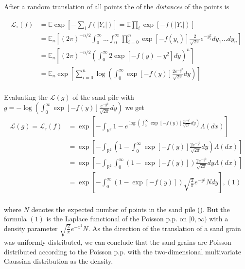 \documentclass{article}
\begin{document}
\begin{itemize}
  After a random translation of all points the  of the \textit{distances} of the points is 

  \begin{align*}
    \mathcal{L}_{\tau}(f) &= \mathbb{E} \exp \left[-\sum_i f(|Y_i|) \right] = \mathbb{E}  \prod_i \exp \left[  -f(|Y_i|)   \right]  \\
    &= \mathbb{E}_n \left[  (2 \pi)^{-n/2}  \int_0^{\infty} \dots \int_0^{\infty}  \prod_{i = 0}^n \exp \left[  -f(y_i)  \right] \frac{2}{\sqrt{2 \pi}}e^{-y_i^2} dy_1 \dots d y_n \right] \\
    &= \mathbb{E}_n \left[(2 \pi)^{-n/2}  \left( \int_{0}^{\infty}  2\exp \left[  -f(y) - y^2   \right] dy \right)^n\right] \\
    &= \mathbb{E}_n \exp \left[ \sum_{i= 0}^n \log \left(   \int_{0}^{\infty}  \exp \left[  -f(y)  \right] \frac{2e^{-y^2}}{\sqrt{2 \pi}} dy \right) \right] \\ 
  \end{align*}

  Evaluating the   $\mathcal{L}(g)$ of the sand pile with $ g = - \log \left(   \int_{0}^{\infty}  \exp \left[  -f(y)  \right] \frac{e^{-y^2}}{\sqrt{2 \pi}} dy \right)  $ we get
    \begin{align*}
      \mathcal{L}(g) = \mathcal{L}_{\tau}(f)& = \exp \left[  -\int_{\mathbb{R}^2} 1 -  e^{\log \left(   \int_{0}^{\infty}  \exp \left[  -f(y)   \right] \frac{2e^{-y^2}}{\sqrt{2 \pi}} dy \right) }\Lambda(dx) \right]    \\
      &= \exp \left[-\int_{\mathbb{R}^2} \left(1  -   \int_{0}^{\infty}  \exp [-f(y)] \frac{2e^{-y^2}}{\sqrt{2 \pi}}  dy \right)  \Lambda(dx)  \right] \\
        &= \exp \left[-\int_{\mathbb{R}^2}\int_{0}^{\infty} \left(1  -     \exp [-f(y)]   \right) \frac{2e^{-y^2}}{\sqrt{2 \pi}}dy  \Lambda(dx)  \right] \\ 
        &= \exp \left[-\int_{0}^{\infty} \left(1  -     \exp [-f(y)]   \right)  \sqrt{\frac{2}{\pi}}e^{-y^2} N dy    \right], (1) \\   
    \end{align*}

    where $N$ denotes the expected number of points in the sand pile (). But the formula $(1)$ is the Laplace functional of the Poisson p.p. on $[0, \infty)$ with a density parameter $\sqrt{\frac{2}{\pi}}e^{-x^2} N.$  As the direction of the translation of a sand grain was uniformly distributed, we can conclude that the sand grains are Poisson distributed according to the Poisson p.p. with the two-dimensional multivariate Gaussian distribution as the density.
      

\end{itemize}
\end{document}
